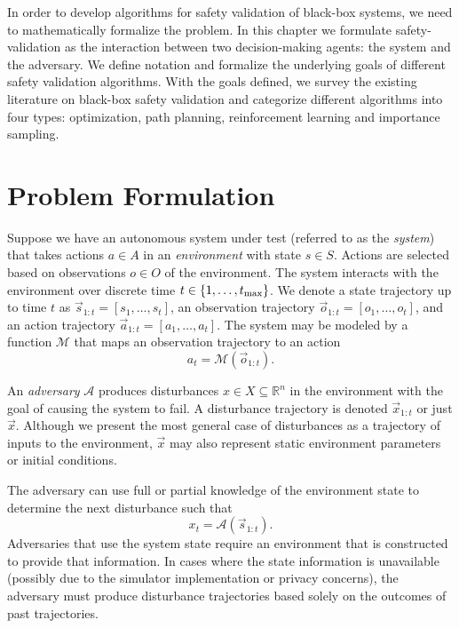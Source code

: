 In order to develop algorithms for safety validation of black-box systems, we need to mathematically formalize the problem. In this chapter we formulate safety-validation as the interaction between two decision-making agents: the system and the adversary. We define notation and formalize the underlying goals of different safety validation algorithms. With the goals defined, we survey the existing literature on black-box safety validation and categorize different algorithms into four types: optimization, path planning, reinforcement learning and importance sampling. 

\section{Problem Formulation}
\label{sec:problem_formulation}
Suppose we have an autonomous system under test (referred to as the \emph{system}) that takes actions $a \in A$ in an \emph{environment} with state $s \in S$. Actions are selected based on observations $o \in O$ of the environment. The system interacts with the environment over discrete time $t \in \{1, \ldots, t_{\rm max}\}$. We denote a state trajectory up to time $t$ as $\vec{s}_{1:t} = [s_1, \ldots, s_t]$, an observation trajectory $\vec{o}_{1:t} = [o_1, \ldots, o_t]$, and an action trajectory $\vec{a}_{1:t} = [a_1, \ldots, a_t]$. The system may be modeled by a function $\mathcal{M}$ that maps an observation trajectory to an action
\begin{equation}
    a_t = \mathcal{M}(\vec{o}_{1:t}) \text{.} \label{eq:system} 
\end{equation}

An \emph{adversary} $\mathcal{A}$ produces disturbances $x \in X\subseteq \mathbb{R}^n$ in the environment with the goal of causing the system to fail. A disturbance trajectory is denoted $\vec{x}_{1:t}$ or just $\vec{x}$. Although we present the most general case of disturbances as a trajectory of inputs to the environment, $\vec{x}$ may also represent static environment parameters or initial conditions. 

The adversary can use full or partial knowledge of the environment state to determine the next disturbance such that
\begin{equation}
    x_t = \mathcal{A}(\vec{s}_{1:t}) \text{.} \label{eq:adversary}
\end{equation}
Adversaries that use the system state require an environment that is constructed to provide that information. In cases where the state information is unavailable (possibly due to the simulator implementation or privacy concerns), the adversary must produce disturbance trajectories based solely on the outcomes of past trajectories. 

